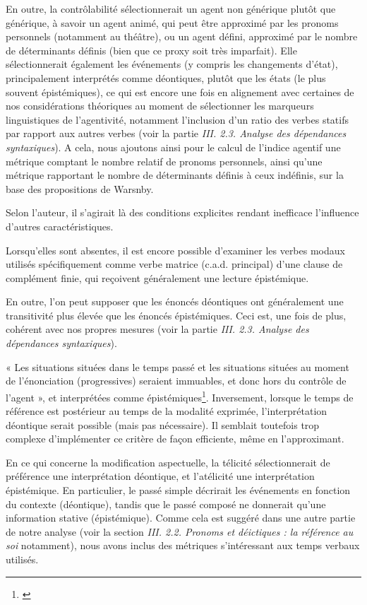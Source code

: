 En outre, la contrôlabilité sélectionnerait un agent non générique plutôt que générique, à savoir un agent animé, qui peut être approximé par les pronoms personnels (notamment au théâtre), ou un agent défini, approximé par le nombre de déterminants définis (bien que ce proxy soit très imparfait). Elle sélectionnerait également les événements (y compris les changements d'état), principalement interprétés comme déontiques, plutôt que les états (le plus souvent épistémiques), ce qui est encore une fois en alignement avec certaines de nos considérations théoriques au moment de sélectionner les marqueurs linguistiques de l’agentivité, notamment l’inclusion d’un ratio des verbes statifs par rapport aux autres verbes  (voir la partie \textit{III. 2.3. Analyse des dépendances syntaxiques}). A cela, nous ajoutons ainsi pour le calcul de l’indice agentif une métrique comptant le nombre relatif de pronoms personnels, ainsi qu’une métrique rapportant le nombre de déterminants définis à ceux indéfinis, sur la base des propositions de Warsnby.

Selon l’auteur, il s'agirait là des conditions explicites rendant inefficace l'influence d'autres caractéristiques.

Lorsqu’elles sont absentes, il est encore possible d’examiner les verbes modaux utilisés spécifiquement comme verbe matrice (c.a.d. principal) d'une clause de complément finie, qui reçoivent généralement une lecture épistémique. 

En outre, l'on peut supposer que les énoncés déontiques ont généralement une transitivité plus élevée que les énoncés épistémiques. Ceci est, une fois de plus, cohérent avec nos propres mesures (voir la partie \textit{III. 2.3. Analyse des dépendances syntaxiques}).

« Les situations situées dans le temps passé et les situations situées au moment de l'énonciation (progressives) seraient immuables, et donc hors du contrôle de l'agent », et interprétées comme épistémiques\footnote{\cite{klinge_impact_1996}}. Inversement, lorsque le temps de référence est postérieur au temps de la modalité exprimée, l'interprétation déontique serait possible (mais pas nécessaire). Il semblait toutefois trop complexe d’implémenter ce critère de façon efficiente, même en l’approximant.

En ce qui concerne la modification aspectuelle, la télicité sélectionnerait de préférence une interprétation déontique, et l'atélicité une interprétation épistémique. En particulier, le passé simple décrirait les événements en fonction du contexte (déontique), tandis que le passé composé ne donnerait qu'une information stative (épistémique). Comme cela est suggéré dans une autre partie de notre analyse (voir la section \textit{III. 2.2. Pronoms et déictiques : la référence au soi} notamment), nous avons inclus des métriques s'intéressant aux temps verbaux utilisés.

